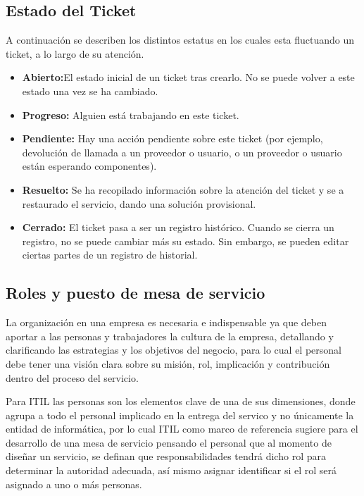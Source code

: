 \subsection{Estado del Ticket}
A continuación se describen los distintos estatus en los cuales esta fluctuando un ticket, a lo largo de su atención. 
\begin{itemize}
	\item \textbf{Abierto:}El estado inicial de un ticket tras crearlo. No se puede volver a este estado una vez se ha cambiado.
	
	\item \textbf{Progreso:}  Alguien está trabajando en este ticket. 
	
\item	\textbf{Pendiente:} Hay una acción pendiente sobre este ticket (por ejemplo, devolución de llamada a un proveedor o usuario, o un proveedor o usuario están esperando componentes).
	
\item	\textbf{Resuelto:} Se ha recopilado información sobre la atención del ticket y se a restaurado el servicio, dando una solución provisional.
	
\item	\textbf{Cerrado:} El ticket pasa a ser un registro histórico. Cuando se cierra un registro, no se puede cambiar más su estado. Sin embargo, se pueden editar ciertas partes de un registro de historial.
\end{itemize}



\subsection{Roles y puesto de mesa de servicio}


La organización en una empresa es necesaria e indispensable ya que deben aportar a las personas y trabajadores la cultura de la empresa, detallando y clarificando las estrategias y los objetivos del negocio, para lo cual el personal debe tener una visión clara sobre su misión, rol, implicación y contribución dentro del proceso del servicio.

Para ITIL las personas son los elementos clave de una de sus dimensiones, donde  agrupa a todo el personal implicado en la entrega del servico y no únicamente la entidad de informática, por lo cual ITIL como marco de referencia sugiere para el desarrollo de una mesa de servicio pensando el personal que al momento de diseñar un servicio, se definan que responsabilidades tendrá dicho rol para determinar la autoridad adecuada, así mismo asignar identificar si el rol será asignado a uno o más personas. 

